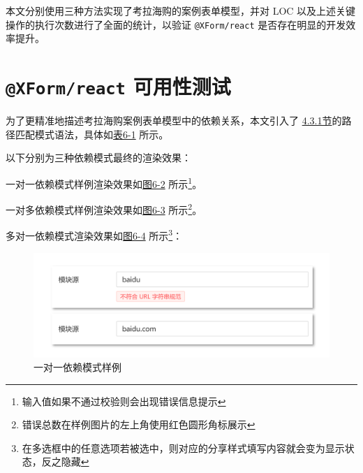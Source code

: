 \documentclass[winfonts,master,twoside]{njuthesis}
\makeatletter
\newcommand{\xform}[1]{\texttt{@XForm/#1}}
\makeatother
\begin{document}
本文分别使用三种方法实现了考拉海购的案例表单模型，并对 LOC 以及上述关键操作的执行次数进行了全面的统计，以验证 \xform{react} 是否存在明显的开发效率提升。

\section{\xform{react} 可用性测试}

为了更精准地描述考拉海购案例表单模型中的依赖关系，本文引入了 \hyperref[node-path-match]{4.3.1节}的路径匹配模式语法，具体如\hyperref[dependency-patterns]{表6-1} 所示。



以下分别为三种依赖模式最终的渲染效果：

一对一依赖模式样例渲染效果如\hyperref[one-to-one-dependency-figure]{图6-2} 所示\footnote{输入值如果不通过校验则会出现错误信息提示}。


一对多依赖模式样例渲染效果如\hyperref[one-to-many-dependency-figure]{图6-3} 所示\footnote{错误总数在样例图片的左上角使用红色圆形角标展示}。


多对一依赖模式渲染效果如\hyperref[many-to-one-dependency-figure]{图6-4} 所示\footnote{在多选框中的任意选项若被选中，则对应的分享样式填写内容就会变为显示状态，反之隐藏}：

\begin{figure}[h]
    \centering
    \includegraphics[width=\textwidth]{figure/chapter-5/one-to-one-dependency.png}
    \caption{一对一依赖模式样例}
    \label{one-to-one-dependency-figure}
\end{figure}
\end{document}
